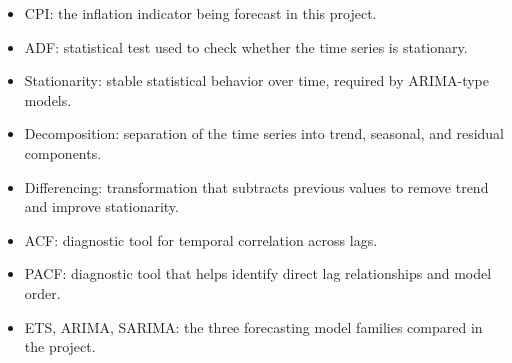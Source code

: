 {
    \begin{itemize}
        \item CPI: the inflation indicator being forecast in this project.
        \item ADF: statistical test used to check whether the time series is stationary.
        \item Stationarity: stable statistical behavior over time, required by ARIMA-type models.
        \item Decomposition: separation of the time series into trend, seasonal, and residual components.
        \item Differencing: transformation that subtracts previous values to remove trend and improve stationarity.
        \item ACF: diagnostic tool for temporal correlation across lags.
        \item PACF: diagnostic tool that helps identify direct lag relationships and model order.
        \item ETS, ARIMA, SARIMA: the three forecasting model families compared in the project.
    \end{itemize}
}
